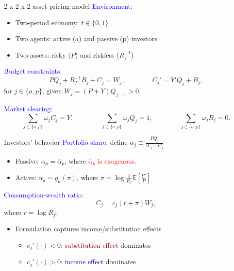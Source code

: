 \begin{frame}{2 x 2 x 2 asset-pricing model }
	\textcolor{blue}{Environment:} 
	\begin{itemize}
		\item Two-period economy: $t \in \{0,1\}$
		\item Two agents: active (a) and passive (p) investors
		\item Two assets: risky ($P$) and riskless ($R_f^{-1}$)
	\end{itemize}
	\vspH \pause
	\textcolor{blue}{Budget constraints:}
\[
P Q_j + R_f^{-1} B_j + C_j = W_j, \qquad \qquad C_j' = Y' Q_j + B_j,
\]
for $j \in \{a,p\}$, given $W_j = (P + Y) Q_{j,-1} > 0$.

\vspH \pause
	\textcolor{blue}{Market clearing:} 
\[
\sum_{j\in\{a,p\}} \omega_j C_j = Y, \qquad \qquad 
\sum_{j\in\{a,p\}} \omega_j Q_j = 1, \qquad \qquad 
\sum_{j\in\{a,p\}} \omega_j B_j = 0.
\]

\end{frame}
\begin{frame}{Investors' behavior}
		\textcolor{blue}{Portfolio share:} define $\alpha_j \equiv \frac{P Q_j}{W_j -C_j}$
	\begin{itemize}
		\item Passive: $\alpha_p = \overline{\alpha}_p$, where \textcolor{red}{$\overline{\alpha}_p$ is exogenous}.
		\item Active: $\alpha_a = g_a(\pi)$,  where $\pi = \log \frac{1}{R_f}\mathbb{E}\left[ \frac{Y'}{P} \right]$
	\end{itemize}

\vspH \vspH \pause

\textcolor{blue}{Consumption-wealth ratio:} 
\[
C_j = c_j(r+\pi) W_j,
\]
where $r = \log R_f $.
	\begin{itemize}
	\item Formulation captures income/substitution effects
	\begin{itemize}
		\item $c_j'(\cdot) < 0$: \textcolor{darkred}{substitution effect} dominates
		\item $c_j'(\cdot) > 0$: \textcolor{darkblue}{income effect} dominates
	\end{itemize}
\end{itemize} 

\end{frame}

